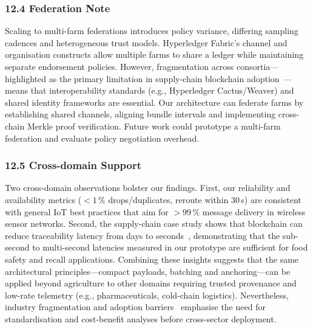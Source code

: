 \documentclass[12pt,onecolumn]{IEEEtran} %
\begin{document}
\subsubsection*{12.4 Federation Note}
Scaling to multi-farm federations introduces policy variance, differing sampling cadences and heterogeneous trust models. Hyperledger Fabric’s channel and organisation constructs allow multiple farms to share a ledger while maintaining separate endorsement policies. However, fragmentation across consortia—highlighted as the primary limitation in supply-chain blockchain adoption~\cite{gsci_blockchain_supplychain_2022}—means that interoperability standards (e.g., Hyperledger Cactus/Weaver) and shared identity frameworks are essential. Our architecture can federate farms by establishing shared channels, aligning bundle intervals and implementing cross-chain Merkle proof verification. Future work could prototype a multi-farm federation and evaluate policy negotiation overhead.

\subsubsection*{12.5 Cross-domain Support}
Two cross-domain observations bolster our findings. First, our reliability and availability metrics ($<1\,\%$ drops/duplicates, reroute within 30\,s) are consistent with general IoT best practices that aim for $>99\,\%$ message delivery in wireless sensor networks. Second, the supply-chain case study shows that blockchain can reduce traceability latency from days to seconds~\cite{hyperledger_walmart_2020}, demonstrating that the sub-second to multi-second latencies measured in our prototype are sufficient for food safety and recall applications. Combining these insights suggests that the same architectural principles—compact payloads, batching and anchoring—can be applied beyond agriculture to other domains requiring trusted provenance and low-rate telemetry (e.g., pharmaceuticals, cold-chain logistics). Nevertheless, industry fragmentation and adoption barriers~\cite{gsci_blockchain_supplychain_2022} emphasise the need for standardisation and cost-benefit analyses before cross-sector deployment.
\end{document}
